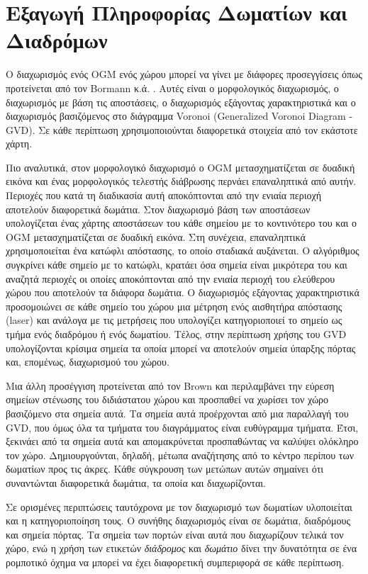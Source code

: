 \section{Εξαγωγή Πληροφορίας Δωματίων και Διαδρόμων}
\label{section:room_segmentation}

Ο διαχωρισμός ενός OGM ενός χώρου μπορεί να γίνει με διάφορες προσεγγίσεις όπως προτείνεται από τον Bormann κ.ά. \cite{bormann2016}. Αυτές είναι ο μορφολογικός διαχωρισμός, ο διαχωρισμός με βάση τις αποστάσεις, ο διαχωρισμός εξάγοντας χαρακτηριστικά και ο διαχωρισμός βασιζόμενος στο διάγραμμα Voronoi (Generalized Voronoi Diagram - GVD). Σε κάθε περίπτωση χρησιμοποιούνται διαφορετικά στοιχεία από τον εκάστοτε χάρτη. 

Πιο αναλυτικά, στον μορφολογικό διαχωρισμό ο OGM μετασχηματίζεται σε δυαδική εικόνα και ένας μορφολογικός τελεστής διάβρωσης περνάει επαναληπτικά από αυτήν. Περιοχές που κατά τη διαδικασία αυτή αποκόπτονται από την ενιαία περιοχή αποτελούν διαφορετικά δωμάτια. Στον διαχωρισμό βάση των αποστάσεων υπολογίζεται ένας χάρτης αποστάσεων του κάθε σημείου με το κοντινότερο του και ο OGM μετασχηματίζεται σε δυαδική εικόνα. Στη συνέχεια, επαναληπτικά χρησιμοποιείται ένα κατώφλι απόστασης, το οποίο σταδιακά αυξάνεται. Ο αλγόριθμος συγκρίνει κάθε σημείο με το κατώφλι, κρατάει όσα σημεία είναι μικρότερα του και αναζητά περιοχές οι οποίες αποκόπτονται από την ενιαία περιοχή του ελεύθερου χώρου που αποτελούν τα διάφορα δωμάτια. Ο διαχωρισμός εξάγοντας χαρακτηριστικά προσομοιώνει σε κάθε σημείο του χώρου μια μέτρηση ενός αισθητήρα απόστασης (laser) και ανάλογα με τις μετρήσεις που υπολογίζει κατηγοριοποιεί το σημείο ως τμήμα ενός διαδρόμου ή ενός δωματίου. Τέλος, στην περίπτωση χρήσης του GVD υπολογίζονται κρίσιμα σημεία τα οποία μπορεί να αποτελούν σημεία ύπαρξης πόρτας και, επομένως, διαχωρισμού του χώρου. 

Μια άλλη προσέγγιση προτείνεται από τον Brown \cite{brown2016} και περιλαμβάνει την εύρεση σημείων στένωσης του διδιάστατου χώρου και προσπαθεί να χωρίσει τον χώρο βασιζόμενο στα σημεία αυτά. Tα σημεία αυτά προέρχονται από μια παραλλαγή του GVD, που όμως όλα τα τμήματα του διαγράμματος είναι ευθύγραμμα τμήματα. Έτσι, ξεκινάει από τα σημεία αυτά και απομακρύνεται προσπαθώντας να καλύψει ολόκληρο τον χώρο. Δημιουργούνται, δηλαδή, μέτωπα αναζήτησης από το κέντρο περίπου των δωματίων προς τις άκρες. Κάθε σύγκρουση των μετώπων αυτών σημαίνει ότι συναντώνται διαφορετικά δωμάτια, τα οποία και διαχωρίζονται.

Σε ορισμένες περιπτώσεις ταυτόχρονα με τον διαχωρισμό των δωματίων υλοποιείται και η κατηγοριοποίηση τους. Ο συνήθης διαχωρισμός είναι σε δωμάτια, διαδρόμους και σημεία πόρτας. Τα σημεία των πορτών είναι αυτά που διαχωρίζουν τελικά τον χώρο, ενώ η χρήση των ετικετών \emph{διάδρομος} και \emph{δωμάτιο} δίνει την δυνατότητα σε ένα ρομποτικό όχημα να μπορεί να έχει διαφορετική συμπεριφορά σε κάθε περίπτωση. 

